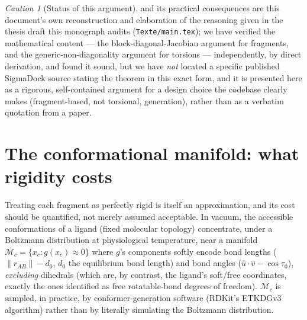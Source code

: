 \documentclass[11pt,a4paper]{report}
\theoremstyle{definition}
\theoremstyle{remark}
\newtheorem{caution}[caution]{Caution}
\newcommand{\file}[1]{\texttt{#1}}
\begin{document}
\begin{caution}[Status of this argument]
 and its practical consequences are this
document's own reconstruction and elaboration of the reasoning given in
the thesis draft this monograph audits (\file{Texte/main.tex}); we have
verified the mathematical content --- the block-diagonal-Jacobian argument
for fragments, and the generic-non-diagonality argument for torsions ---
independently, by direct derivation, and found it sound, but we have
\emph{not} located a specific published SigmaDock source stating the
theorem in this exact form, and it is presented here as a rigorous,
self-contained argument for a design choice the codebase clearly makes
(fragment-based, not torsional, generation), rather than as a verbatim
quotation from a paper.
\end{caution}

\section{The conformational manifold: what rigidity costs}
\label{sec:conformational-manifold}

Treating each fragment as perfectly rigid is itself an approximation, and
its cost should be quantified, not merely assumed acceptable. In vacuum,
the accessible conformations of a ligand (fixed molecular topology)
concentrate, under a Boltzmann distribution at physiological temperature,
near a manifold
$\mathcal M_c=\{x_c:g(x_c)\approx0\}$ where $g$'s components softly encode
bond lengths ($\|r_{AB}\|-d_0$, $d_0$ the equilibrium bond length) and bond
angles ($\hat u\cdot\hat v-\cos\tau_0$), \emph{excluding} dihedrals (which
are, by contrast, the ligand's soft/free coordinates, exactly the ones
 identified as free rotatable-bond degrees of freedom).
$\mathcal M_c$ is sampled, in practice, by conformer-generation software
(RDKit's ETKDGv3 algorithm) rather than by literally simulating the
Boltzmann distribution.
\end{document}
